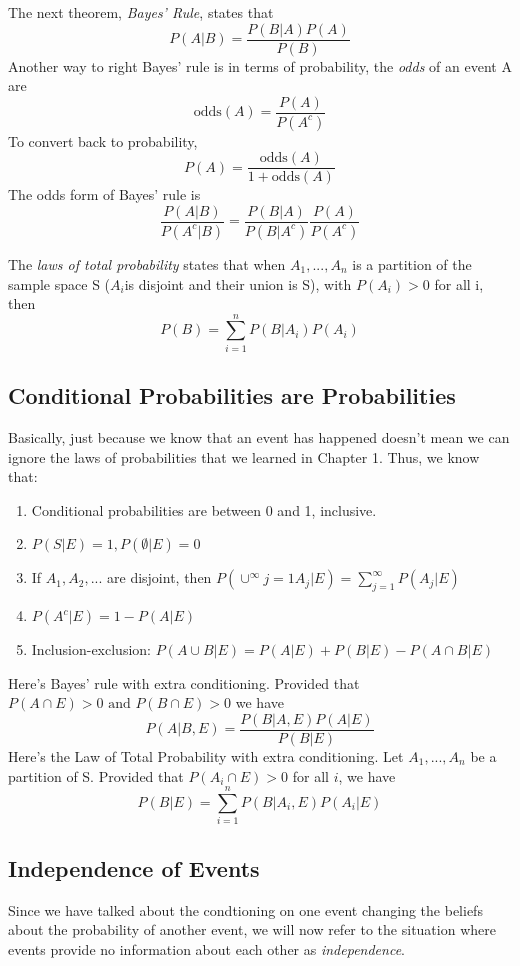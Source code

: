 \documentclass[12pt, letterpaper]{article}
\begin{document}
The next theorem, \textit{Bayes' Rule}, states that \[P(A|B) = \frac{P(B|A)P(A)}{P(B)} \]
Another way to right Bayes' rule is in terms of probability, the \textit{odds} of an event A are \[\text{odds}(A) = \frac{P(A)}{P(A^c)} \]
To convert back to probability, \[P(A) = \frac{\text{odds}(A)}{1 + \text{odds}(A)} \] 
The odds form of Bayes' rule is \[\frac{P(A | B)}{P(A^c | B)} = \frac{P(B|A)}{P(B|A^c)}\frac{P(A)}{P(A^c)}\] 

The \textit{laws of total probability} states that when \(A_1, ..., A_n\) is a partition of the sample space S (\(A_i\)is disjoint and their union is S), with \(P(A_i) > 0\) for all i, then
\[P(B) = \sum^{n}_{i=1}P(B|A_i)P(A_i) \]

\subsection{Conditional Probabilities are Probabilities}

Basically, just because we know that an event has happened doesn't mean we can ignore the laws of probabilities that we learned in Chapter 1. Thus, we know that:
\begin{enumerate}
    \item Conditional probabilities are between 0 and 1, inclusive.
    \item \(P(S|E) = 1, P(\emptyset | E) = 0\)
    \item If \(A_1, A_2, ...\) are disjoint, then \(P(\cup^{\infty}{j = 1}A_j|E) = \sum^{\infty}_{j = 1}P(A_j|E)\)
    \item \(P(A^c|E) = 1 - P(A|E)\)
    \item Inclusion-exclusion: \(P(A \cup B | E) = P(A|E) + P(B|E) - P(A \cap B | E)\) 
\end{enumerate}
Here's Bayes' rule with extra conditioning. Provided that \(P(A \cap E) > 0 \text{ and } P(B \cap E) > 0\) we have
\[P(A|B, E) = \frac{P(B|A, E)P(A|E)}{P(B|E)}\]
Here's the Law of Total Probability with extra conditioning. Let \(A_1, ..., A_n\) be a partition of S. Provided that \(P(A_i \cap E) > 0\) for all \(i\), we have 
\[P(B|E) = \sum^{n}_{i=1}P(B|A_i, E)P(A_i|E)\]

\subsection{Independence of Events}

Since we have talked about the condtioning on one event changing the beliefs about the probability of another event, we will now refer to the situation where events provide no information about each other as \textit{independence}.
\end{document}
